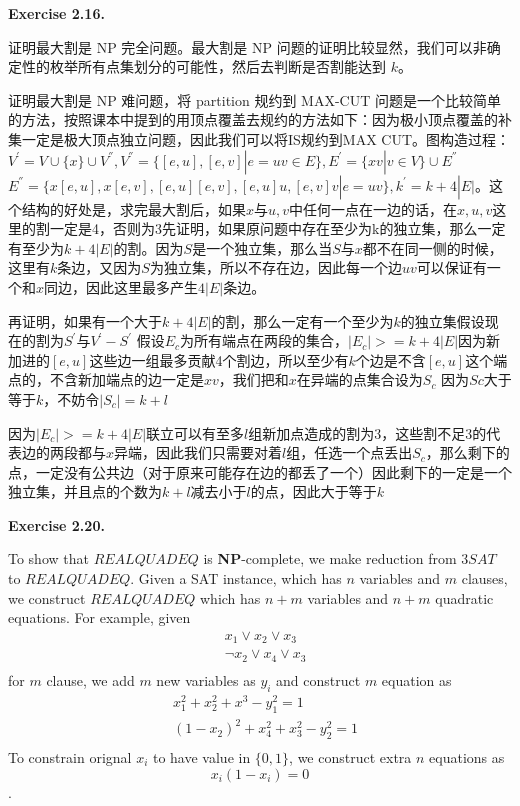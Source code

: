 \documentclass[a4paper]{article}
\newenvironment{exercise}[1]{
	\par
	\noindent\textbf{Exercise #1.}\quad
}{
	\par
	\bigskip
}
\begin{document}
	\begin{exercise}{2.16}
		证明最大割是 NP 完全问题。最大割是 NP 问题的证明比较显然，我们可以非确定性的枚举所有点集划分的可能性，然后去判断是否割能达到 $k$。

		证明最大割是 NP 难问题，将 partition 规约到 MAX-CUT 问题是一个比较简单的方法，按照课本中提到的用顶点覆盖去规约的方法如下：因为极小顶点覆盖的补集一定是极大顶点独立问题，因此我们可以将IS规约到MAX CUT。图构造过程：$V^{'}=V\cup\{x\}\cup V^{''},V^{''}=\{[e,u],[e,v]|e=uv\in E\},E^{'}=\{xv|v\in V\}\cup E^{''}$ $E^{''}=\{x[e,u],x[e,v],[e,u][e,v],[e,u]u,[e,v]v|e=uv\},k^{'}=k+4|E|$。这个结构的好处是，求完最大割后，如果$x$与$u,v$中任何一点在一边的话，在$x,u,v$这里的割一定是4，否则为3先证明，如果原问题中存在至少为k的独立集，那么一定有至少为$k+4|E|$的割。因为$S$是一个独立集，那么当$S$与$x$都不在同一侧的时候，这里有$k$条边，又因为$S$为独立集，所以不存在边，因此每一个边$uv$可以保证有一个和$x$同边，因此这里最多产生$4|E|$条边。

		再证明，如果有一个大于$k+4|E|$的割，那么一定有一个至少为$k$的独立集假设现在的割为$S^{'}$与$V^{'}-S^{'} $  假设$E_c$为所有端点在两段的集合，$|E_c| >=k+4|E|$因为新加进的$[e,u]$这些边一组最多贡献4个割边，所以至少有$k$个边是不含$[e,u]$这个端点的，不含新加端点的边一定是$xv$，我们把和$x$在异端的点集合设为$S_c$ 因为$Sc$大于等于$k$，不妨令$|S_c|=k+l$

		因为$|E_c|>= k+ 4|E| $联立可以有至多$l$组新加点造成的割为3，这些割不足3的代表边的两段都与$x$异端，因此我们只需要对着$l$组，任选一个点丢出$S_c$，那么剩下的点，一定没有公共边（对于原来可能存在边的都丢了一个）因此剩下的一定是一个独立集，并且点的个数为$k+l $减去小于$l$的点，因此大于等于$k$
	\end{exercise}

	\begin{exercise}{2.20}
		To show that $REALQUADEQ$ is \textbf{NP}-complete, we make reduction from $3SAT$ to $REALQUADEQ$.
		Given a SAT instance, which has $n$ variables and $m$ clauses, we construct $REALQUADEQ$ which has $n+m$ variables and $n+m$ quadratic equations. For example, given
		\begin{align*}
			& x_1\vee x_2\vee x_3\\
			&\neg x_2\vee x_4\vee x_3\\
		\end{align*}
		for $m$ clause, we add $m$ new variables as $y_i$ and construct $m$ equation as 
		\begin{align*}
			&x_1^2+x_2^2+x^3-y_1^2=1\\
			&(1-x_2)^2+x_4^2+x_3^2-y_2^2=1\\
		\end{align*}
		To constrain orignal $x_i$ to have value in $\{0,1\}$, we construct extra $n$ equations as 
		$$x_i(1-x_i)=0$$.
	\end{exercise}
        
\end{document}
